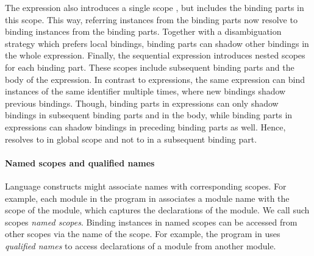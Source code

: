 The  expression also introduces a single scope ,
  but includes the binding parts in this scope.
This way, referring instances 
  from the binding parts now resolve to binding instances 
  from the binding parts.
Together with a disambiguation strategy which prefers local bindings, 
  binding parts can shadow other bindings in the whole  expression.
Finally, the sequential  expression introduces nested scopes  
  for each binding part.
These scopes include subsequent binding parts and the body of the  expression.
In contrast to  expressions,
  the same  expression can bind instances of the same identifier multiple times,
  where new bindings shadow previous bindings.
Though, binding parts in  expressions can only shadow bindings in subsequent binding parts and in the body,
  while binding parts in  expressions can shadow bindings in preceding binding parts as well.
Hence,  resolves to 
  in global scope and not to  in a subsequent binding part.
  


\paragraph{Named scopes and qualified names}

Language constructs might associate names with corresponding scopes.
For example, each module in the program in 
  associates a module name with the scope of the module, 
    which captures the declarations of the module.
We call such scopes \emph{named scopes}.
Binding instances in named scopes can be accessed from other scopes via the name of the scope.
For example, the program in  uses \emph{qualified names} to access declarations of a module from another module.

